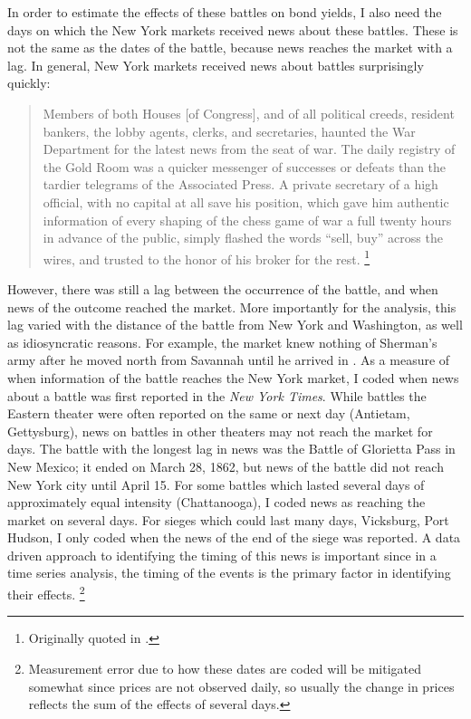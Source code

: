 In order to estimate the effects of these battles on bond yields, I also need the days on which the New York markets received news about these battles.
These is not the same as the dates of the battle, because news reaches the market with a lag.
In general, New York markets received news about battles surprisingly quickly:
\begin{quote}
Members of both Houses [of Congress], and of all political creeds, resident bankers, the lobby agents, clerks, and secretaries, haunted the War Department for the latest news from the seat of war.
The daily registry of the Gold Room was a quicker messenger of successes or defeats than the tardier telegrams of the Associated Press. A private secretary of a high official, with no capital at all save his position, which gave him authentic information of every shaping of the chess game of war a full twenty hours in advance of the public, simply flashed the words ``sell, buy'' across the wires, and trusted to the honor of his broker for the rest. \parencite[245]{Medbery1870a}\footnote{Originally quoted in \textcite{WillardGuinnaneEtAl1996}.}
\end{quote}
However, there was still a lag between the occurrence of the battle, and when news of the outcome reached the market.
More importantly for the analysis, this lag varied with the distance of the battle from New York and Washington, as well as idiosyncratic reasons.
For example, the market knew nothing of Sherman's army after he moved north from Savannah until he arrived in  \textcite[204]{Mitchell1903}.
As a measure of when information of the battle reaches the New York market, I coded when news about a battle was first reported in the \textit{New York Times}.
While battles the Eastern theater were often reported on the same or next day (Antietam, Gettysburg), news on battles in other theaters may not reach the market for days.
The battle with the longest lag in news was the Battle of Glorietta Pass in New Mexico; it ended on March 28, 1862, but news of the battle did not reach New York city until April 15.
For some battles which lasted several days of approximately equal intensity  (Chattanooga), I coded news as reaching the market on several days.
For sieges which could last many days, \eg{}Vicksburg, Port Hudson, I only coded when the news of the end of the siege was reported.
A data driven approach to identifying the timing of this news is important since in a time series analysis, the timing of the events is the primary factor in identifying their effects.%
\footnote{
  Measurement error due to how these dates are coded will be mitigated somewhat since prices are not observed daily, so usually the change in prices reflects the sum of the effects of several days.
}

